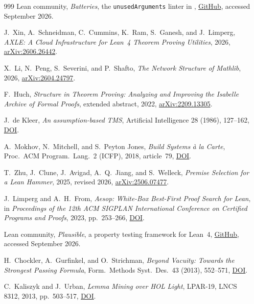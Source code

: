 \documentclass[10pt]{article}
\begin{document}
\begin{thebibliography}{999}
 Lean community, \emph{Batteries}, the
\texttt{unusedArguments} linter in ,
\href{https://github.com/leanprover-community/batteries}{GitHub}, accessed
September 2026.

 J.~Xin, A.~Schneidman, C.~Cummins, K.~Ram, S.~Ganesh, and
J.~Limperg, \emph{AXLE: A Cloud Infrastructure for Lean~4 Theorem Proving
Utilities}, 2026, \href{https://arxiv.org/abs/2606.26442}{arXiv:2606.26442}.

 X.~Li, N.~Peng, S.~Severini, and P.~Shafto,
\emph{The Network Structure of Mathlib}, 2026,
\href{https://arxiv.org/abs/2604.24797}{arXiv:2604.24797}.

 F.~Huch, \emph{Structure in Theorem Proving: Analyzing and
Improving the Isabelle Archive of Formal Proofs}, extended abstract, 2022,
\href{https://arxiv.org/abs/2209.13305}{arXiv:2209.13305}.

 J.~de Kleer, \emph{An assumption-based TMS}, Artificial
Intelligence 28 (1986), 127--162,
\href{https://doi.org/10.1016/0004-3702(86)90080-9}{DOI}.

 A.~Mokhov, N.~Mitchell, and S.~Peyton Jones,
\emph{Build Systems \`a la Carte}, Proc.\ ACM Program.\ Lang.\ 2 (ICFP),
2018, article~79, \href{https://doi.org/10.1145/3236774}{DOI}.

 T.~Zhu, J.~Clune, J.~Avigad, A.~Q.~Jiang, and
S.~Welleck, \emph{Premise Selection for a Lean Hammer}, 2025, revised 2026,
\href{https://arxiv.org/abs/2506.07477}{arXiv:2506.07477}.

 J.~Limperg and A.~H.~From, \emph{Aesop: White-Box Best-First
Proof Search for Lean}, in \emph{Proceedings of the 12th ACM SIGPLAN
International Conference on Certified Programs and Proofs}, 2023,
pp.~253--266, \href{https://doi.org/10.1145/3573105.3575671}{DOI}.

 Lean community, \emph{Plausible}, a property testing
framework for Lean~4,
\href{https://github.com/leanprover-community/plausible}{GitHub}, accessed
September 2026.

 H.~Chockler, A.~Gurfinkel, and O.~Strichman,
\emph{Beyond Vacuity: Towards the Strongest Passing Formula}, Form.\ Methods
Syst.\ Des.\ 43 (2013), 552--571,
\href{https://doi.org/10.1007/s10703-013-0192-6}{DOI}.

 C.~Kaliszyk and J.~Urban, \emph{Lemma Mining over HOL
Light}, LPAR-19, LNCS 8312, 2013, pp.~503--517,
\href{https://doi.org/10.1007/978-3-642-45221-5_34}{DOI}.


\end{thebibliography}
\end{document}
